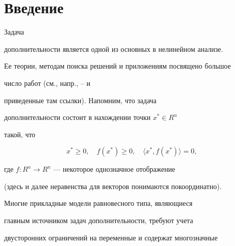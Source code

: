 \date{}




\pagestyle{plain} %







\maketitle


\label{begin}











\section{Введение}





Задача


дополнительности является одной из основных в нелинейном анализе.


Ее теории, методам поиска решений и приложениям посвящено большое


число работ (см., напр., \cite{BM83}--\cite{Isa92} и


приведенные там ссылки). Напомним, что задача


дополнительности состоит в нахождении точки $x^{*} \in R^{n}$


такой, что


\begin{equation}\label{eq:1}


x^{*} \ge 0, \quad f(x^*) \ge 0, \quad \langle x^{*},f(x^*)\rangle = 0,


\end{equation}


где $f:R^{n} \to R^{n}$ --- некоторое однозначное отображение


(здесь и далее неравенства для векторов понимаются покоординатно).


Многие прикладные модели равновесного типа, являющиеся


главным источником задач дополнительности, требуют учета 


двусторонних ограничений на переменные и содержат многозначные


